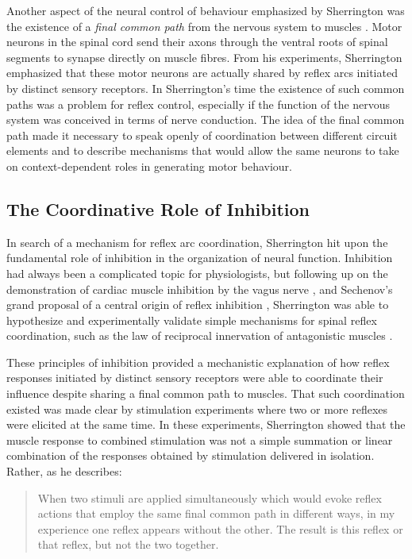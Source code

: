 Another aspect of the neural control of behaviour emphasized by Sherrington was the existence of a \emph{final common path} from the nervous system to muscles \cite{Sherrington1904}. Motor neurons in the spinal cord send their axons through the ventral roots of spinal segments to synapse directly on muscle fibres. From his experiments, Sherrington emphasized that these motor neurons are actually shared by reflex arcs initiated by distinct sensory receptors. In Sherrington's time the existence of such common paths was a problem for reflex control, especially if the function of the nervous system was conceived in terms of nerve conduction. The idea of the final common path made it necessary to speak openly of coordination between different circuit elements and to describe mechanisms that would allow the same neurons to take on context-dependent roles in generating motor behaviour.

\subsection{The Coordinative Role of Inhibition}

In search of a mechanism for reflex arc coordination, Sherrington hit upon the fundamental role of inhibition in the organization of neural function. Inhibition had always been a complicated topic for physiologists, but following up on the demonstration of cardiac muscle inhibition by the vagus nerve \cite{Weber1846}, and Sechenov's grand proposal of a central origin of reflex inhibition \cite{Sechenov1863}, Sherrington was able to hypothesize and experimentally validate simple mechanisms for spinal reflex coordination, such as the law of reciprocal innervation of antagonistic muscles \cite{Sherrington1893b}.

These principles of inhibition provided a mechanistic explanation of how reflex responses initiated by distinct sensory receptors were able to coordinate their influence despite sharing a final common path to muscles. That such coordination existed was made clear by stimulation experiments where two or more reflexes were elicited at the same time. In these experiments, Sherrington showed that the muscle response to combined stimulation was not a simple summation or linear combination of the responses obtained by stimulation delivered in isolation. Rather, as he describes:

\blockquote[{\protect\cite[p.461]{Sherrington1904}}]{When two stimuli are applied simultaneously which would evoke reflex actions that employ the same final common path in different ways, in my experience one reflex appears without the other. The result is this reflex or that reflex, but not the two together.}

